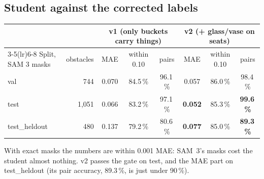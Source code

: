 \documentclass[10pt,a4paper]{article}
\begin{document}
\subsection{Student against the corrected labels}
\begin{center}\small
\begin{tabular}{lrcccccc}
\toprule
 & & \multicolumn{3}{c}{v1 (only buckets carry things)} & \multicolumn{3}{c}{v2 (+ glass/vase on seats)} \\
\cmidrule(lr){3-5}\cmidrule(lr){6-8}
Split, SAM 3 masks & obstacles & MAE & within 0.10 & pairs & MAE & within 0.10 & pairs \\
\midrule
val & 744 & 0.070 & 84.5\,\% & 96.1\,\% & 0.057 & 86.0\,\% & 98.4\,\% \\
test & 1{,}051 & 0.066 & 83.2\,\% & 97.1\,\% & \textbf{0.052} & 85.3\,\% & \textbf{99.6\,\%} \\
test\_heldout & 480 & 0.137 & 79.2\,\% & 80.6\,\% & \textbf{0.077} & 85.0\,\% & \textbf{89.3\,\%} \\
\bottomrule
\end{tabular}
\end{center}
With exact masks the numbers are within 0.001 MAE: SAM~3's masks cost the student almost nothing. v2 passes the gate on test, and
the MAE part on test\_heldout (its pair accuracy, 89.3\,\%, is just under 90\,\%).
\end{document}
